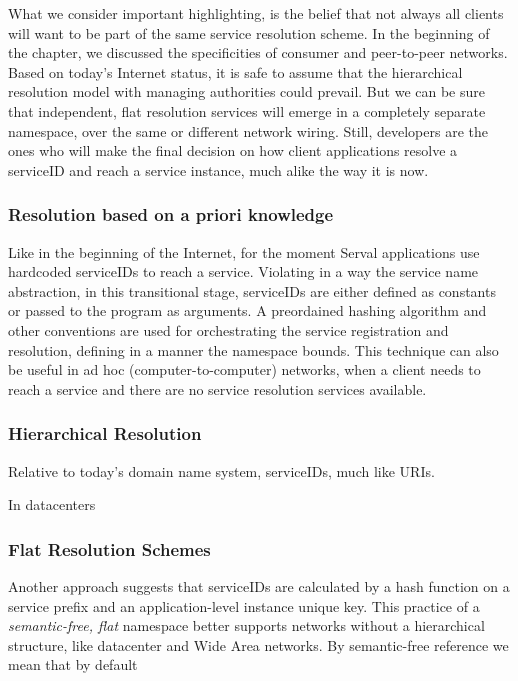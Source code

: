 What we consider important highlighting, is the belief that not always all clients will want to be part of the same service resolution scheme.
In the beginning of the chapter, we discussed the specificities of consumer and peer-to-peer networks.
Based on today's Internet status, it is safe to assume that the hierarchical resolution model with managing authorities could prevail.
But we can be sure that independent, flat resolution services will emerge in a completely separate namespace, over the same or different network wiring.
Still, developers are the ones who will make the final decision on how client applications resolve a serviceID and reach a service instance, much alike the way it is now.



\subsubsection{Resolution based on a priori knowledge}
Like in the beginning of the Internet, for the moment Serval applications use hardcoded serviceIDs to reach a service.
Violating in a way the service name abstraction, in this transitional stage, serviceIDs are either defined as constants or passed to the program as arguments.
A preordained hashing algorithm and other conventions are used for orchestrating the service registration and resolution, defining in a manner the namespace bounds.
This technique can also be useful in ad hoc (computer-to-computer) networks, when a client needs to reach a service and there are no service resolution services available.


\subsubsection{Hierarchical Resolution}
\label{sec:hierresol}
Relative to today's domain name system, serviceIDs, much like URIs.

In datacenters



\subsubsection{Flat Resolution Schemes}
Another approach suggests that serviceIDs are calculated by a hash function on a service prefix and an application-level instance unique key.
This practice of a \emph{semantic-free, flat} namespace better supports networks without a hierarchical structure, like datacenter and Wide Area networks.
By semantic-free\cite{Walfisha2004} reference we mean that by default 

